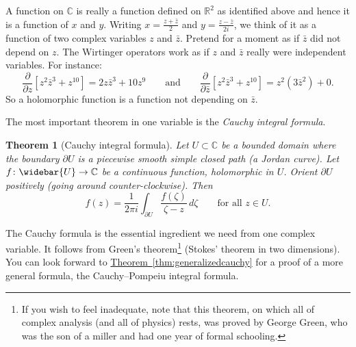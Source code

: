\documentclass[12pt,openany]{book}
\newcommand{\C}{{\mathbb{C}}}
\newcommand{\R}{{\mathbb{R}}}
\newcommand{\myindex}[1]{#1\index{#1}}
\theoremstyle{plain}
\newtheorem{thm}{Theorem}[section]
\theoremstyle{remark}
\theoremstyle{definition}
\theoremstyle{exercise}
\theoremstyle{example}
\newcommand{\thmref}[1]{\hyperref[#1]{Theorem~\ref*{#1}}}
\begin{document}
A function on $\C$ is really a function defined on
$\R^2$ as identified above and hence it is a function of $x$ and $y$.
Writing
$x = \frac{z+\bar{z}}{2}$ and
$y = \frac{z-\bar{z}}{2i}$, we think of it as a function of two
complex variables $z$ and $\bar{z}$.  Pretend for a moment as if $\bar{z}$ did not
depend on $z$.
The Wirtinger operators
work as if $z$ and $\bar{z}$ really were independent variables.  For
instance:
\begin{equation*}
\frac{\partial}{\partial z}
\left[ z^2 \bar{z}^3 + z^{10} \right]
=
2z \bar{z}^3 + 10 z^{9}
\qquad
\text{and}
\qquad
\frac{\partial}{\partial \bar{z}}
\left[ z^2 \bar{z}^3 + z^{10} \right]
=
z^2 ( 3 \bar{z}^2 ) + 0 .
\end{equation*}
So a holomorphic function is a function not depending on $\bar{z}$.

The most important theorem in one variable is
the \emph{\myindex{Cauchy integral formula}}.

\begin{thm}[Cauchy integral formula]
Let $U \subset \C$ be a bounded domain where the boundary $\partial U$
is a piecewise smooth
simple closed path (a Jordan curve).  Let $f \colon \widebar{U} \to \C$ be a continuous function,
holomorphic in $U$.
Orient $\partial U$ positively (going around counter-clockwise).
Then
\begin{equation*}
f(z) =
\frac{1}{2\pi i}
\int_{\partial U}
\frac{f(\zeta)}{\zeta-z}
\,
d \zeta 
\qquad \text{for all $z \in U$.}
\end{equation*}
\end{thm}


The Cauchy formula is the essential ingredient we need from 
one complex variable.  It follows
from Green's theorem\footnote{If you wish to feel inadequate,
note that this theorem, on which all of complex analysis (and all of physics)
rests, was proved by
George Green, who was the son of a miller and had one year of formal
schooling.}  (Stokes' theorem in two
dimensions).  You can look forward to
\thmref{thm:generalizedcauchy} for a proof of a more general formula,
the Cauchy--Pompeiu integral formula.
\end{document}
